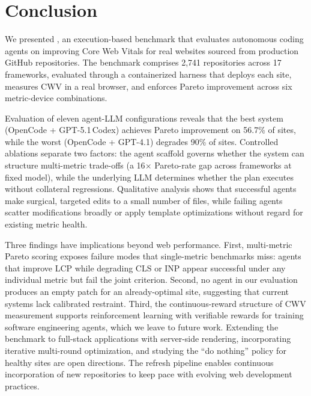 \section{Conclusion}

We presented \OurBench, an execution-based benchmark that evaluates autonomous coding agents on improving Core Web Vitals for real websites sourced from production GitHub repositories. The benchmark comprises 2{,}741 repositories across 17 frameworks, evaluated through a containerized harness that deploys each site, measures CWV in a real browser, and enforces Pareto improvement across six metric-device combinations.

Evaluation of eleven agent-LLM configurations reveals that the best system (OpenCode + GPT-5.1\,Codex) achieves Pareto improvement on 56.7\% of sites, while the worst (OpenCode + GPT-4.1) degrades 90\% of sites. Controlled ablations separate two factors: the agent scaffold governs whether the system can structure multi-metric trade-offs (a 16$\times$ Pareto-rate gap across frameworks at fixed model), while the underlying LLM determines whether the plan executes without collateral regressions. Qualitative analysis shows that successful agents make surgical, targeted edits to a small number of files, while failing agents scatter modifications broadly or apply template optimizations without regard for existing metric health.

Three findings have implications beyond web performance. First, multi-metric Pareto scoring exposes failure modes that single-metric benchmarks miss: agents that improve LCP while degrading CLS or INP appear successful under any individual metric but fail the joint criterion. Second, no agent in our evaluation produces an empty patch for an already-optimal site, suggesting that current systems lack calibrated restraint. Third, the continuous-reward structure of CWV measurement supports reinforcement learning with verifiable rewards for training software engineering agents, which we leave to future work. Extending the benchmark to full-stack applications with server-side rendering, incorporating iterative multi-round optimization, and studying the ``do nothing'' policy for healthy sites are open directions. The refresh pipeline enables continuous incorporation of new repositories to keep pace with evolving web development practices.
